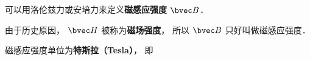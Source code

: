 
\begin{issues}
\issueDraft
\end{issues}

可以用洛伦兹力或安培力来定义\textbf{磁感应强度} $\bvec B$．

由于历史原因， $\bvec H$ 被称为\textbf{磁场强度}， 所以 $\bvec B$ 只好叫做磁感应强度．

磁感应强度单位为\textbf{特斯拉（Tesla）}， 即